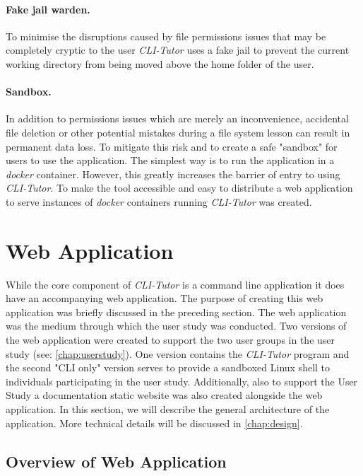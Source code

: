 \paragraph{Fake jail warden.} To minimise the disruptions caused by
file permissions issues that may be completely cryptic to the user
\textit{CLI-Tutor}  uses a fake jail to prevent the current working directory
from being moved above the home folder of the user.

\paragraph{Sandbox.} In addition to permissions issues which are merely an
inconvenience, accidental file deletion or other potential mistakes during a
file system lesson can result in permanent data loss. To mitigate this risk and
to create a safe "sandbox" for users to use the application. The simplest
way is to run the application in a \textit{docker}\cite{dockerinc_2022}
container. However, this greatly increases the barrier of entry to using
\textit{CLI-Tutor}. To make the tool accessible and easy to distribute
a web application to serve instances of \textit{docker} containers running
\textit{CLI-Tutor} was created.

\section{Web Application}

While the core component of \textit{CLI-Tutor} is a command line application it
does have an accompanying web application. The purpose of creating this web
application was briefly discussed in the preceding section. The web
application was the medium through which the user study was conducted. Two
versions of the web application were created to support the two user
groups in the user study (see: \autoref{chap:userstudy}). One version contains
the \textit{CLI-Tutor} program and the second "CLI only" version serves to
provide a sandboxed Linux shell to individuals participating in the user study.
Additionally, also to support the User Study a documentation static website was
also created alongside the web application. In this section, we will describe
the general architecture of the application. More technical details will be
discussed in \autoref{chap:design}.

\subsection{Overview of Web Application}


